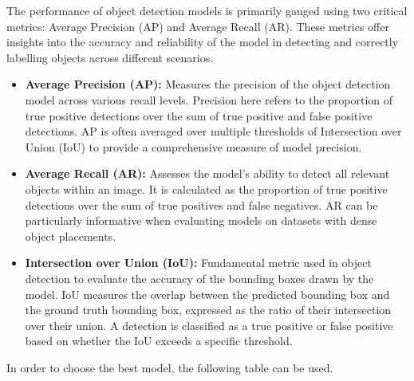 \documentclass[12pt,oneside]{book} %
\begin{document}
The performance of object detection models is primarily gauged using two
critical metrics: Average Precision (AP) and Average Recall (AR). These metrics
offer insights into the accuracy and reliability of the model in detecting and
correctly labelling objects across different scenarios.

\begin{itemize}
    \item \textbf{Average Precision (AP):} Measures the precision of the object detection model across various recall levels. Precision here refers to the proportion of true positive detections over the sum of true positive and false positive detections. AP is often averaged over multiple thresholds of Intersection over Union (IoU) to provide a comprehensive measure of model precision.
    \item \textbf{Average Recall (AR):} Assesses the model's ability to detect all relevant objects within an image. It is calculated as the proportion of true positive detections over the sum of true positives and false negatives. AR can be particularly informative when evaluating models on datasets with dense object placements.
    \item \textbf{Intersection over Union (IoU):} Fundamental metric used in object detection to evaluate the accuracy of the bounding boxes drawn by the model. IoU measures the overlap between the predicted bounding box and the ground truth bounding box, expressed as the ratio of their intersection over their union. A detection is classified as a true positive or false positive based on whether the IoU exceeds a specific threshold.
\end{itemize}

In order to choose the best model, the following table can be used.
\end{document}
